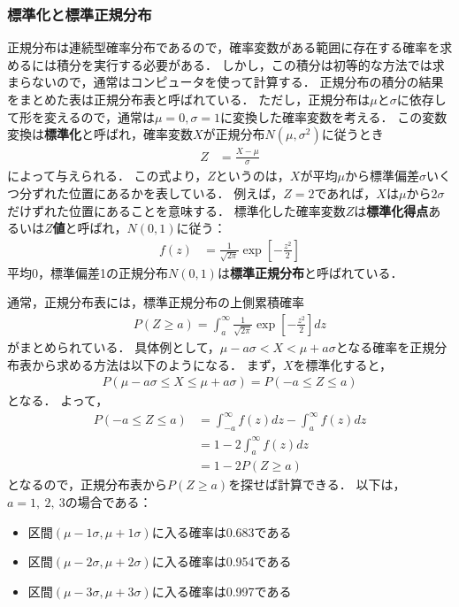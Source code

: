 \subsubsection*{標準化と標準正規分布}
%
正規分布は連続型確率分布であるので，確率変数がある範囲に存在する確率を求めるには積分を実行する必要がある．
%
しかし，この積分は初等的な方法では求まらないので，通常はコンピュータを使って計算する．
%
正規分布の積分の結果をまとめた表は正規分布表と呼ばれている．
%
ただし，正規分布は$ \mu $と$ \sigma $に依存して形を変えるので，通常は$ \mu=0, \sigma=1 $に変換した確率変数を考える．
%
この変数変換は\textbf{標準化}と呼ばれ，確率変数$ X $が正規分布$ N(\mu,\sigma^{2}) $に従うとき
%
\begin{align}
	Z &= \frac{X-\mu}{\sigma}
	\label{eq:Z}
\end{align}
%
によって与えられる．
%
この式より，$ Z $というのは，$ X $が平均$ \mu $から標準偏差$ \sigma $いくつ分ずれた位置にあるかを表している．
例えば，$ Z=2 $であれば，$ X $は$ \mu $から$ 2\sigma $だけずれた位置にあることを意味する．
%
標準化した確率変数$ Z $は\textbf{標準化得点}あるいは\textbf{$ Z $値}と呼ばれ，$ N(0, 1) $に従う：
%
\begin{align}
	f(z) &= \frac{1}{\sqrt{2\pi}} \exp \left[ -\frac{z^{2}}{2} \right]
	\label{eq:s_normal}
\end{align}
%
平均0，標準偏差1の正規分布$ N(0, 1) $は\textbf{標準正規分布}と呼ばれている．
%

%
通常，正規分布表には，標準正規分布の上側累積確率
%
\begin{align*}
	P(Z \geq a) = \int_{a}^{\infty} \frac{1}{\sqrt{2\pi}} \exp \left[ -\frac{z^{2}}{2} \right]dz
\end{align*}
%
がまとめられている．
%
具体例として，$ \mu - a\sigma < X < \mu + a\sigma $となる確率を正規分布表から求める方法は以下のようになる．
%
まず，$ X $を標準化すると，
%
\begin{align*}
	P(\mu - a\sigma \leq X \leq \mu + a\sigma) = P(-a \leq Z \leq a)
\end{align*}
%
となる．
%
よって，
%
\begin{align*}
	P(-a \leq Z \leq a) 
	&= \int_{-a}^{\infty} f(z) dz - \int_{a}^{\infty} f(z) dz \\
	&= 1 - 2 \int_{a}^{\infty} f(z) dz \\
	&= 1 - 2P(Z \geq a)
\end{align*}
%
となるので，正規分布表から$ P(Z \geq a) $を探せば計算できる．
%
以下は，$ a=1,\ 2,\ 3 $の場合である：
%
\begin{itemize}
\item
区間$ (\mu-1\sigma, \mu+1\sigma) $に入る確率は0.683である
\item
区間$ (\mu-2\sigma, \mu+2\sigma) $に入る確率は0.954である
\item
区間$ (\mu-3\sigma, \mu+3\sigma) $に入る確率は0.997である
\end{itemize}
%

